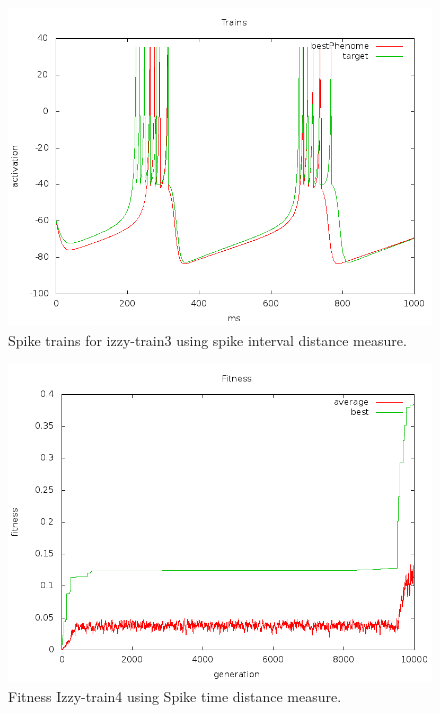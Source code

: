 \documentclass[a4paper]{article}
\begin{document}
\begin{figure}[htb!]
  \centering
  \includegraphics[width=\textwidth]{Waveform-izzy3-trains-plot.png}
  \caption{Spike trains for izzy-train3 using spike interval distance measure.}
\end{figure}

\newpage

\begin{figure}[htb!]
  \centering
  \includegraphics[width=\textwidth]{SpikeTime-izzy4-fitness-plot.png}
  \caption{Fitness Izzy-train4 using Spike time distance measure.}
\end{figure}
\end{document}
